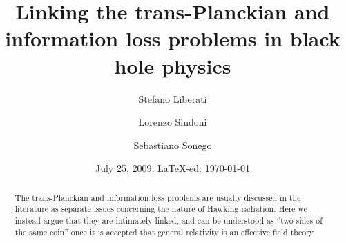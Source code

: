 \documentclass[prd, groupedaddress, showpacs, showkeys, onecolumn, nofootinbib]{revtex4}
\begin{document}
\title{Linking the trans-Planckian and information loss problems in black hole physics}
\author{Stefano Liberati}
\author{Lorenzo Sindoni}
\author{Sebastiano Sonego}
\date{July 25, 2009; \LaTeX-ed: \today}
\bigskip
\begin{abstract}
\bigskip

The trans-Planckian and information loss problems are usually discussed in the literature as separate issues concerning the nature of Hawking radiation. Here we instead argue that they are intimately linked, and can be understood as ``two sides of the same coin'' once it is accepted that general relativity is an effective field theory. 

\end{abstract}
\def\e{{\mathrm e}}%
\def\g{{\mbox{\sl g}}}%
\def\Box{\nabla^2}%
\def\d{{\mathrm d}}%
\def\ie{{\em i.e.\/}}%
\def\eg{{\em e.g.\/}}%
\def\etc{{\em etc.\/}}%
\def\etal{{\em et al.\/}}%
\newcommand{\scri}{\mathscr{I}}
\renewcommand{\thefigure}{\arabic{figure}}
\def\HRULE{{\bigskip\hrule\bigskip}}%
\def\implies{{\Rightarrow}}
\maketitle
\end{document}
